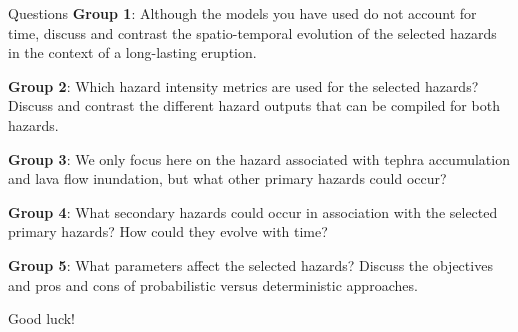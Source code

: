 \documentclass[10pt,aspectratio=169]{beamer}
\begin{document}
  

\begin{frame}{Questions}
    \textbf{Group 1}: Although the models you have used do not account for time, discuss and contrast the \alert{spatio-temporal evolution} of the selected hazards in the context of a \alert{long-lasting eruption}.

    \textbf{Group 2}: Which \alert{hazard intensity metrics} are used for the selected hazards? Discuss and contrast the different hazard outputs that can be compiled for both hazards.

    \textbf{Group 3}: We only focus here on the hazard associated with tephra accumulation and lava flow inundation, but what other \alert{primary hazards} could occur? 

    \textbf{Group 4}: What \alert{secondary hazards} could occur in association with the selected primary hazards? How could they evolve with time?

    \textbf{Group 5}: What \alert{parameters} affect the selected hazards? Discuss the \alert{objectives} and \alert{pros and cons} of probabilistic versus deterministic approaches.

\end{frame}

\begin{frame}[standout]
    Good luck!
\end{frame}
  



\end{document}
